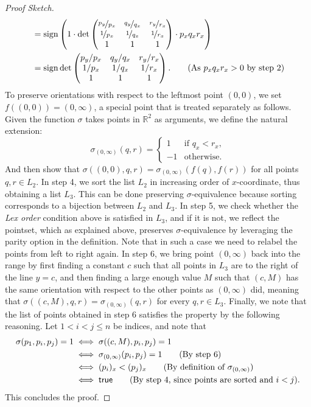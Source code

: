 \begin{proof}[Proof Sketch]
\begin{align*}
                        &= \operatorname{sign} \left(1 \cdot \det  \begin{pmatrix} \nicefrac{p_y}{p_x} & \nicefrac{q_y}{q_x} & \nicefrac{r_y}{r_x} \\ \nicefrac{1}{p_x} & \nicefrac{1}{q_x} & \nicefrac{1}{r_x} \\ 1 & 1 & 1 \end{pmatrix} \cdot  p_x q_x r_x  \right)\\ &= \operatorname{sign} \det \begin{pmatrix} p_y/p_x & q_y/q_x & r_y/r_x \\ 1/p_x & 1/q_x & 1/r_x \\ 1 & 1 & 1 \end{pmatrix}.\tag{As $p_x q_x r_x > 0$ by step 2}
\end{align*}
To preserve orientations with respect to the leftmost point $(0, 0)$, we set $f( (0, 0)) = (0, \infty)$, a special point that is treated separately as follows. Given the function $\sigma$ takes points in $\mathbb{R}^2$ as arguments, we define the natural extension:
\[
  \sigma_{(0, \infty)}(q, r) = \begin{cases}
    1 & \text{if } q_x < r_x, \\
    -1 & \text{otherwise}.  
  \end{cases}
\] 
And then show that $\sigma((0, 0), q, r) = \sigma_{(0, \infty)}(f(q), f(r))$ for all points $q, r \in L_2$. 
In step 4, we sort the list $L_2$ in increasing order of $x$-coordinate, thus obtaining a list $L_3$. This can be done preserving $\sigma$-equivalence because sorting corresponds to a bijection between $L_2$ and $L_3$.
In step 5, we check whether the \emph{Lex order} condition above is satisfied in $L_3$, and if it is not, we reflect the pointset, which as explained above, preserves $\sigma$-equivalence by leveraging the parity option in the definition. Note that in such a case we need to relabel the points from left to right again.
In step 6, we bring point $(0, \infty)$ back into the range by first finding a constant $c$ such that all points in $L_3$ are to the right of the line $y=c$, and then finding a large enough value $M$ such that $(c, M)$ has the same orientation with respect to the other points as $(0, \infty)$ did, meaning that 
\(\sigma((c, M), q, r) = \sigma_{(0, \infty)}(q, r)\) for every $q, r \in L_3$.
Finally, we note that the list of points obtained in step 6 satisfies the  property by the following reasoning. Let $1 < i < j \leq n$ be indices, and note that 
\begin{align*}
  \sigma(p_1, p_i, p_j) = 1 &\iff \sigma((c, M), p_i, p_j) = 1\\
                            &\iff \sigma_{(0, \infty)}(p_i, p_j) = 1\tag{By step 6}\\
                            &\iff (p_i)_x < (p_j)_x \tag{By definition of $\sigma_{(0, \infty)}$}\\
                            &\iff \textsf{true} \tag{By step 4, since points are sorted and $i < j$}.
\end{align*}
This concludes the proof.
\end{proof}

